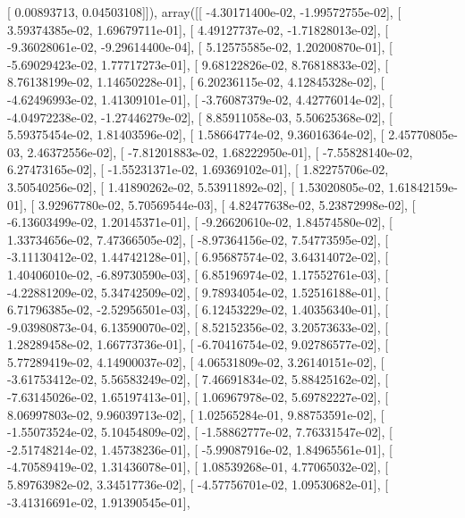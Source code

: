 \documentclass{article}
\begin{document}
       [ 0.00893713,  0.04503108]]), array([[ -4.30171400e-02,  -1.99572755e-02],
       [  3.59374385e-02,   1.69679711e-01],
       [  4.49127737e-02,  -1.71828013e-02],
       [ -9.36028061e-02,  -9.29614400e-04],
       [  5.12575585e-02,   1.20200870e-01],
       [ -5.69029423e-02,   1.77717273e-01],
       [  9.68122826e-02,   8.76818833e-02],
       [  8.76138199e-02,   1.14650228e-01],
       [  6.20236115e-02,   4.12845328e-02],
       [ -4.62496993e-02,   1.41309101e-01],
       [ -3.76087379e-02,   4.42776014e-02],
       [ -4.04972238e-02,  -1.27446279e-02],
       [  8.85911058e-03,   5.50625368e-02],
       [  5.59375454e-02,   1.81403596e-02],
       [  1.58664774e-02,   9.36016364e-02],
       [  2.45770805e-03,   2.46372556e-02],
       [ -7.81201883e-02,   1.68222950e-01],
       [ -7.55828140e-02,   6.27473165e-02],
       [ -1.55231371e-02,   1.69369102e-01],
       [  1.82275706e-02,   3.50540256e-02],
       [  1.41890262e-02,   5.53911892e-02],
       [  1.53020805e-02,   1.61842159e-01],
       [  3.92967780e-02,   5.70569544e-03],
       [  4.82477638e-02,   5.23872998e-02],
       [ -6.13603499e-02,   1.20145371e-01],
       [ -9.26620610e-02,   1.84574580e-02],
       [  1.33734656e-02,   7.47366505e-02],
       [ -8.97364156e-02,   7.54773595e-02],
       [ -3.11130412e-02,   1.44742128e-01],
       [  6.95687574e-02,   3.64314072e-02],
       [  1.40406010e-02,  -6.89730590e-03],
       [  6.85196974e-02,   1.17552761e-03],
       [ -4.22881209e-02,   5.34742509e-02],
       [  9.78934054e-02,   1.52516188e-01],
       [  6.71796385e-02,  -2.52956501e-03],
       [  6.12453229e-02,   1.40356340e-01],
       [ -9.03980873e-04,   6.13590070e-02],
       [  8.52152356e-02,   3.20573633e-02],
       [  1.28289458e-02,   1.66773736e-01],
       [ -6.70416754e-02,   9.02786577e-02],
       [  5.77289419e-02,   4.14900037e-02],
       [  4.06531809e-02,   3.26140151e-02],
       [ -3.61753412e-02,   5.56583249e-02],
       [  7.46691834e-02,   5.88425162e-02],
       [ -7.63145026e-02,   1.65197413e-01],
       [  1.06967978e-02,   5.69782227e-02],
       [  8.06997803e-02,   9.96039713e-02],
       [  1.02565284e-01,   9.88753591e-02],
       [ -1.55073524e-02,   5.10454809e-02],
       [ -1.58862777e-02,   7.76331547e-02],
       [ -2.51748214e-02,   1.45738236e-01],
       [ -5.99087916e-02,   1.84965561e-01],
       [ -4.70589419e-02,   1.31436078e-01],
       [  1.08539268e-01,   4.77065032e-02],
       [  5.89763982e-02,   3.34517736e-02],
       [ -4.57756701e-02,   1.09530682e-01],
       [ -3.41316691e-02,   1.91390545e-01],
\end{document}
